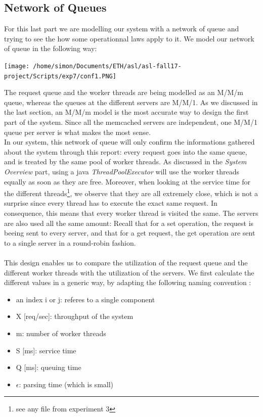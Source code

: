 \documentclass[11pt,a4paper]{article}
\begin{document}
\subsection{Network of Queues}
For this last part we are modelling our system with a network of queue and trying to see the how some operationnal laws apply to it. We model our network of queue in the following way:
\begin{center} 
\texttt{[image: /home/simon/Documents/ETH/asl/asl-fall17-project/Scripts/exp7/conf1.PNG]}
\end{center} 
The request queue and the worker threads are being modelled as an M/M/m queue, whereas the queues at the different servers are M/M/1. As we discussed in the last section, an M/M/m model is the most accurate way to design the first part of the system. Since all the memcached servers are independent, one M/M/1 queue per server is what makes the most sense. 
\\
In our system, this network of queue will only confirm the informations gathered about the system through this report: every request goes into the same queue, and is treated by the same pool of worker threads. As discussed in the \textit{System Overview} part, using a java \textit{ThreadPoolExecutor} will use the worker threads equally as soon as they are free. Moreover, when looking at the service time for the different threads\footnote{see any file from experiment 3}, we observe that they are all extremely close, which is not a surprise since every thread has to execute the exact same request. In consequence, this means that every worker thread is visited the same. 
The servers are also used all the same amount: Recall that for a set operation, the request is beeing sent to every server, and that for a get request, the get operation are sent to a single server in a round-robin fashion.    
\\\\
This design enables us to compare the utilization of the request queue and the different worker threads with the utilization of the servers. We first calculate the different values in a generic way, by adapting the following naming convention :
\begin{itemize}
\item an index i or j: referes to a single component
\item X [req/sec]: throughput of the system
\item m: number of worker threads
\item S [ms]: service time
\item Q [ms]: queuing time
\item \(\epsilon \): parsing time (which is small)
\end{itemize}  
\end{document}
